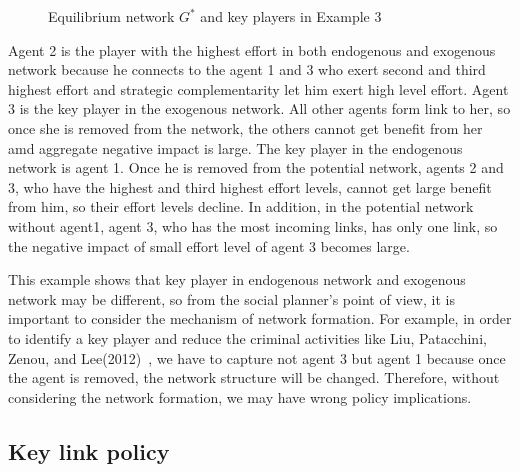 \documentclass[12pt]{article}
\theoremstyle{definition}
\begin{document}
\begin{figure}[h]
\caption{Equilibrium network $G^{*}$ and key players in Example 3} \label{fig:ex3}
\end{figure}

Agent 2 is the player with the highest effort in both endogenous and exogenous network because he connects to the agent 1 and 3 who exert second and third highest effort and strategic complementarity let him exert high level effort.
Agent 3 is the key player in the exogenous network.
All other agents form link to her, so once she is removed from the network, the others cannot get benefit from her amd aggregate negative impact is large.
The key player in the endogenous network is agent 1.
Once he is removed from the potential network, agents 2 and 3, who have the highest and third highest effort levels, cannot get large benefit from him, so their effort levels decline.
In addition, in the potential network without agent1, agent 3, who has the most incoming links, has only one link, so the negative impact of small effort level of agent 3 becomes large.

This example shows that key player in endogenous network and exogenous network may be different, so from the social planner's point of view, it is important to consider the mechanism of network formation.
For example, in order to identify a key player and reduce the criminal activities like Liu, Patacchini, Zenou, and Lee(2012)~\cite{criminal}, we have to capture not agent 3 but agent 1 because once the agent is removed, the network structure will be changed.
Therefore, without considering the network formation, we may have wrong policy implications.

\subsection{Key link policy}
\end{document}
